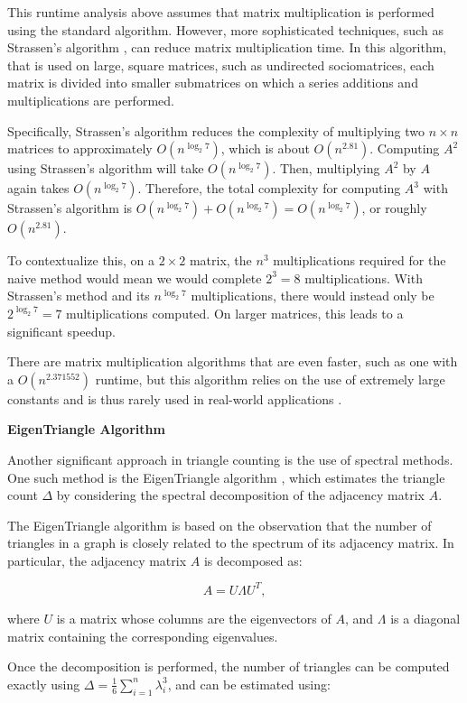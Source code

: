 \documentclass[11pt]{article}
\newcommand{\subsubsubsection}[1]{
  \vspace{1em} %
  \noindent\textbf{#1} %
  \vspace{0.5em} %
}
\begin{document}
This runtime analysis above assumes that matrix multiplication is performed using the standard algorithm.
However, more sophisticated techniques, such as Strassen's algorithm \cite{strassen_gaussian_1969}, can reduce matrix multiplication time.
In this algorithm, that is used on large, square matrices, such as undirected sociomatrices, each matrix is divided into smaller submatrices on which a series additions and multiplications are performed.

Specifically, Strassen's algorithm reduces the complexity of multiplying two $n \times n$ matrices to approximately $O(n^{\log_2 7})$, which is about $O(n^{2.81})$.
Computing $A^2$ using Strassen's algorithm will take $O(n^{\log_2 7})$.
Then, multiplying $A^2$ by $A$ again takes $O(n^{\log_2 7})$.
Therefore, the total complexity for computing $A^3$ with Strassen's algorithm is $O(n^{\log_2 7}) + O(n^{\log_2 7}) = O(n^{\log_2 7})$, or roughly $O(n^{2.81})$.

To contextualize this, on a $2 \times 2$ matrix, the $n^3$ multiplications required for the naive method would mean we would complete $2^3 = 8$ multiplications.
With Strassen's method and its $n^{\log_2 7}$ multiplications, there would instead only be $2^{\log_2 7} = 7$ multiplications computed.
On larger matrices, this leads to a significant speedup.

There are matrix multiplication algorithms that are even faster, such as one with a $O(n^{2.371552})$ runtime, but this algorithm relies on the use of extremely large constants and is thus rarely used in real-world applications \cite{williams_new_2023}.

\subsubsubsection{EigenTriangle Algorithm}

Another significant approach in triangle counting is the use of spectral methods.
One such method is the EigenTriangle algorithm \cite{tsourakakis_fast_2008}, which estimates the triangle count $\Delta$ by considering the spectral decomposition of the adjacency matrix $A$.

The EigenTriangle algorithm is based on the observation that the number of triangles in a graph is closely related to the spectrum of its adjacency matrix.
In particular, the adjacency matrix $A$ is decomposed as:

\[
A = U \Lambda U^T,
\]

where $U$ is a matrix whose columns are the eigenvectors of $A$, and $\Lambda$ is a diagonal matrix containing the corresponding eigenvalues.

Once the decomposition is performed, the number of triangles can be computed exactly using $\Delta = \frac{1}{6} \sum_{i=1}^{n} \lambda_i^3$, and can be estimated using:
\end{document}
